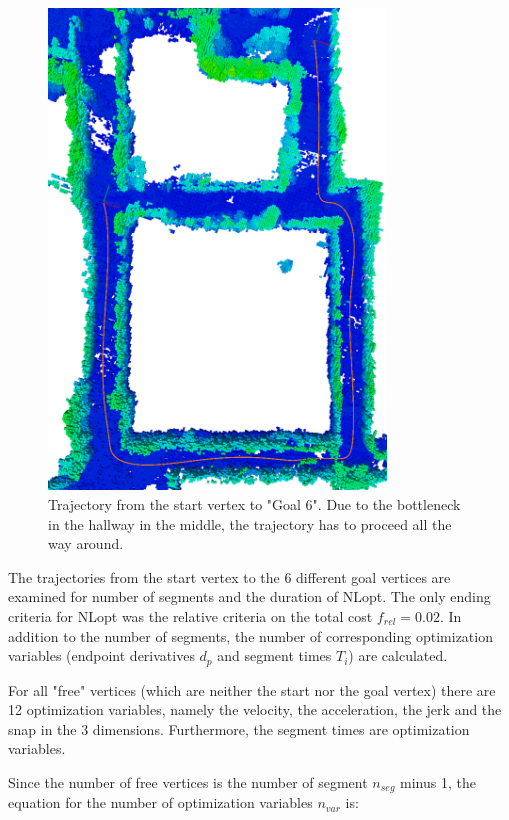 \begin{figure}[H]
   \centering
   \includegraphics[angle=90,trim = 18mm 0mm 0mm 0mm,clip, width=0.8\textwidth]{pics/MapNlopt.png}
   \caption{Trajectory from the start vertex to "Goal 6". Due to the bottleneck in the hallway in the middle, the trajectory has to proceed all the way around.}
   \label{pic:Goal6}
\end{figure}

The trajectories from the start vertex to the 6 different goal vertices are examined for number of segments and the duration of NLopt. The only ending criteria for NLopt was the relative criteria on the total cost $f_{rel} = 0.02$. 
In addition to the number of segments, the number of corresponding optimization variables (endpoint derivatives $d_p$ and segment times $T_i$) are calculated. 

For all "free" vertices (which are neither the start nor the goal vertex) there are 12 optimization variables, namely the velocity, the acceleration, the jerk and the snap in the 3 dimensions. Furthermore, the segment times are optimization variables. \newline

Since the number of free vertices is the number of segment $n_{seg}$ minus 1, the equation for the number of optimization variables $n_{var}$ is:

